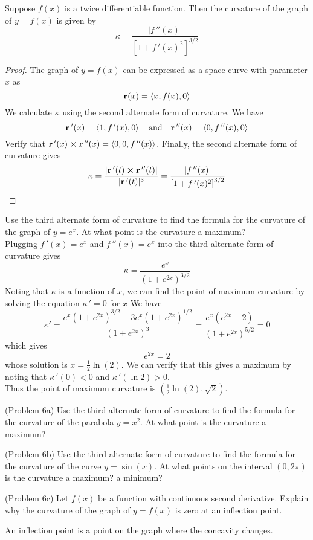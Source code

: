 \documentclass[handout]{ximera}
\begin{document}
\begin{proposition}
Suppose $f(x)$ is a twice differentiable function. Then the curvature of the graph of $y = f(x)$ is given by
\[
\kappa = \frac{|f\,''(x)|}{\left[1+ f\,'(x)^2\right]^{3/2}}
\]
\end{proposition}

\begin{proof}
The graph of $y = f(x)$ can be expressed as a space curve with parameter $x$ as
\[
\mathbf r(x) = \left\langle x, f(x), 0\right\rangle
\]
We calculate $\kappa$ using the second alternate form of curvature. We have
\[
\mathbf r\,'(x) = \left\langle 1, f\,'(x), 0\right\rangle \quad \text{and} \quad \mathbf r\,''(x) = \left\langle 0, f\,''(x), 0\right\rangle 
\]
Verify that $\mathbf r\,'(x) \boldsymbol\times \mathbf r\,''(x) = \left\langle 0,0,f\,''(x)\right\rangle$.
Finally, the second alternate form of curvature gives
\[
\kappa = \frac{|\mathbf r\,'(t) \boldsymbol\times \mathbf r\,''(t)|}{|\mathbf r\,'(t)|^3} = \frac{|f\,''(x)|}{\left[1+ f\,'(x)^2\right]^{3/2}}
\]
\end{proof}

\begin{example}[Example 6]
Use the third alternate form of curvature to find the formula for the curvature of the graph of $y = e^x$.  At what point is the curvature a maximum?\\
Plugging $f\,'(x) = e^x$ and $f\,''(x) = e^x$ into the third alternate form of curvature gives
\[
\kappa = \frac{e^x}{(1+e^{2x})^{3/2}}
\]
Noting that $\kappa$ is a function of $x$, we can find the point of maximum curvature by solving the equation $\kappa\,' = 0$ for $x$
We have
\[
\kappa ' = \frac{e^x(1+e^{2x})^{3/2} - 3e^x(1+e^{2x})^{1/2}}{(1+e^{2x})^3} = \frac{e^x\left(e^{2x} - 2\right)}{(1+e^{2x})^{5/2}} = 0
\]
which gives
\[
 e^{2x} = 2
\]
whose solution is $ x = \frac12 \ln(2)$. We can verify that this gives a maximum by noting that $\kappa \,' (0) < 0$ and $\kappa \,' (\ln 2) > 0$. \\
Thus the point of maximum curvature is $\left(\frac12 \ln(2), \sqrt 2\right)$.
\end{example}

\begin{problem}(Problem 6a)
Use the third alternate form of curvature to find the formula for the curvature of the parabola $y = x^2$.  At what point is the curvature a maximum?\\
\end{problem}

\begin{problem}(Problem 6b)
Use the third alternate form of curvature to find the formula for the curvature of the curve $y = \sin(x)$.  
At what points on the interval $(0, 2\pi)$ is the curvature a maximum? a minimum?\\
\end{problem}


\begin{problem}(Problem 6c)
Let $f(x)$ be a function with continuous second derivative. Explain why the curvature of the graph of $y = f(x)$ is zero at an inflection point.\\
\begin{hint}
An inflection point is a point on the graph where the concavity changes.
\end{hint}
\end{problem}
\end{document}
